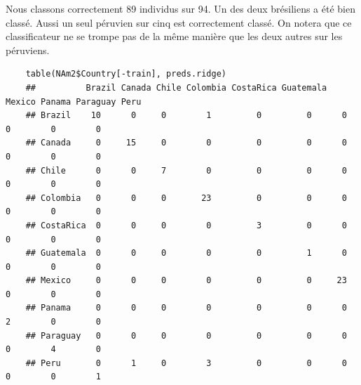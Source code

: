 \documentclass[12pt,a4paper]{article}
\begin{document}
Nous classons correctement 89 individus sur 94. Un des deux brésiliens a été bien classé. Aussi un seul péruvien sur cinq est correctement classé. On notera que ce classificateur ne se trompe pas de la même manière que les deux autres sur les péruviens. \vspace{2mm}
\begin{lstlisting}
	table(NAm2$Country[-train], preds.ridge)
	## 			Brazil Canada Chile Colombia CostaRica Guatemala Mexico Panama Paraguay Peru
	## Brazil    10      0     0        1         0         0      0      0        0        0
	## Canada     0     15     0        0         0         0      0      0        0        0
	## Chile      0      0     7        0         0         0      0      0        0        0
	## Colombia   0      0     0       23         0         0      0      0        0        0
	## CostaRica  0      0     0        0         3         0      0      0        0        0
	## Guatemala  0      0     0        0         0         1      0      0        0        0
	## Mexico     0      0     0        0         0         0     23      0        0        0
	## Panama     0      0     0        0         0         0      0      2        0        0
	## Paraguay   0      0     0        0         0         0      0      0        4        0
	## Peru       0      1     0        3         0         0      0      0        0        1
\end{lstlisting}
\end{document}
